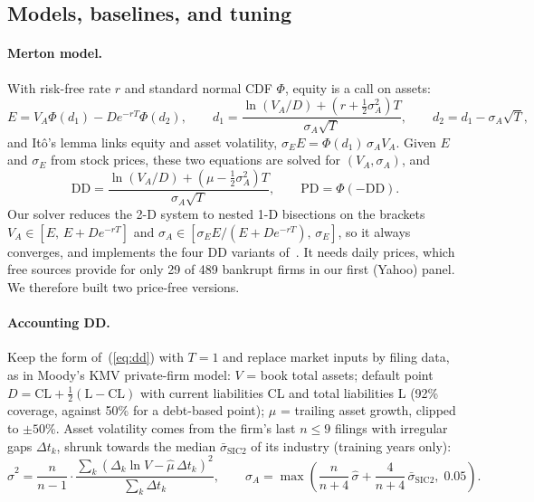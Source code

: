 \subsection{Models, baselines, and tuning}
\label{sec:models}

\paragraph{Merton model.} With risk-free rate $r$ and standard normal CDF $\Phi$, equity is a call on assets:
\begin{equation}
  E = V_A \Phi(d_1) - D e^{-rT}\Phi(d_2), \qquad
  d_1 = \frac{\ln(V_A/D) + (r + \frac{1}{2}\sigma_A^2)T}{\sigma_A\sqrt{T}}, \qquad d_2 = d_1 - \sigma_A\sqrt{T},
  \label{eq:merton}
\end{equation}
and It\^o's lemma links equity and asset volatility, $\sigma_E E = \Phi(d_1)\,\sigma_A V_A$. Given $E$ and
$\sigma_E$ from stock prices, these two equations are solved for $(V_A,\sigma_A)$, and
\begin{equation}
  \mathrm{DD} = \frac{\ln(V_A/D) + (\mu - \frac{1}{2}\sigma_A^2)T}{\sigma_A\sqrt{T}}, \qquad \mathrm{PD} = \Phi(-\mathrm{DD}).
  \label{eq:dd}
\end{equation}
Our solver reduces the 2-D system to nested 1-D bisections on the brackets
$V_A \in [E,\, E + De^{-rT}]$ and $\sigma_A \in [\sigma_E E/(E+De^{-rT}),\, \sigma_E]$, so it always converges,
and implements the four DD variants of~\cite{bharath2008}. It needs daily prices, which free sources provide
for only 29 of 489 bankrupt firms in our first (Yahoo) panel. We therefore built two price-free versions.

\paragraph{Accounting DD.} Keep the form of~(\ref{eq:dd}) with $T=1$ and replace market inputs by filing data,
as in Moody's KMV private-firm model:
$V$ = book total assets; default point $D = \mathrm{CL} + \frac{1}{2}(\mathrm{L}-\mathrm{CL})$ with current
liabilities CL and total liabilities L (92\% coverage, against 50\% for a debt-based point); $\mu$ = trailing
asset growth, clipped to $\pm 50\%$. Asset volatility comes from the firm's last $n\le 9$ filings with
irregular gaps $\Delta t_k$, shrunk towards the median $\bar\sigma_{\mathrm{SIC2}}$ of its industry (training years only):
\begin{equation}
  \hat\sigma^2 = \frac{n}{n-1}\cdot\frac{\sum_k (\Delta_k \ln V - \hat\mu\,\Delta t_k)^2}{\sum_k \Delta t_k},
  \qquad
  \sigma_A = \max\left(\frac{n}{n+4}\,\hat\sigma + \frac{4}{n+4}\,\bar\sigma_{\mathrm{SIC2}},\; 0.05\right).
  \label{eq:sigma}
\end{equation}

